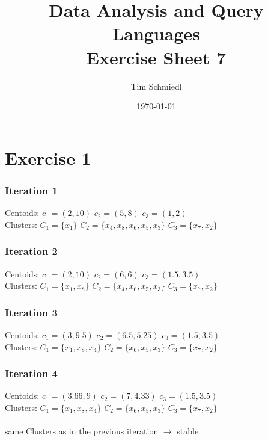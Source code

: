 \documentclass{article}
\begin{document}
\title{Data Analysis and Query Languages \\
 Exercise Sheet 7}
\date{\today}
\author{Tim Schmiedl} 
\maketitle

\section*{Exercise 1}

\subsubsection*{Iteration 1}
Centoids: $c_1=(2,10)$ $c_2=(5,8)$ $c_3=(1,2)$\\
Clusters: $C_1=\{x_1\}$ $C_2=\{x_4,x_8,x_6,x_5,x_3\}$ $C_3=\{x_7,x_2\}$\\

\subsubsection*{Iteration 2}
Centoids: $c_1=(2,10)$ $c_2=(6,6)$ $c_3=(1.5,3.5)$\\
Clusters: $C_1=\{x_1,x_8\}$ $C_2=\{x_4,x_6,x_5,x_3\}$ $C_3=\{x_7,x_2\}$\\

\subsubsection*{Iteration 3}
Centoids: $c_1=(3,9.5)$ $c_2=(6.5,5.25)$ $c_3=(1.5,3.5)$\\
Clusters: $C_1=\{x_1,x_8,x_4\}$ $C_2=\{x_6,x_5,x_3\}$ $C_3=\{x_7,x_2\}$\\

\subsubsection*{Iteration 4}
Centoids: $c_1=(3.66,9)$ $c_2=(7,4.33)$ $c_3=(1.5,3.5)$\\
Clusters: $C_1=\{x_1,x_8,x_4\}$ $C_2=\{x_6,x_5,x_3\}$ $C_3=\{x_7,x_2\}$\\
\\
same Clusters as in the previous iteration $\to$ stable
	
\end{document}
